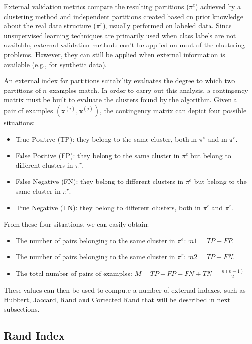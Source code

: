 External validation metrics compare the resulting partitions ($\pi^e$) achieved by a clustering method and independent partitions created based on prior knowledge about the real data structure ($\pi^r$), usually performed on labeled data. Since unsupervised learning techniques are primarily used when class labels are not available, external validation methods can't be applied on most of the clustering problems. However, they can still be applied when external information is available (e.g., for synthetic data)\cite{palacio2019evaluation}. 

An external index for partitions suitability evaluates the degree to which two partitions of $n$ examples match. In order to carry out this analysis, a contingency matrix must be built to evaluate the clusters found by the algorithm. Given a pair of examples $(\mathbf{x}^{(i)},\mathbf{x}^{(j)})$, the contingency matrix can depict four possible situations:
\begin{itemize}
    \item True Positive (TP): they belong to the same cluster, both in $\pi^e$ and in $\pi^r$.
    \item False Positive (FP): they belong to the same cluster in $\pi^e$ but belong to different clusters in $\pi^r$.
    \item False Negative (FN): they belong to different clusters in $\pi^e$ but belong to the same cluster in $\pi^r$.
    \item True Negative (TN): they belong to different clusters, both in $\pi^e$ and $\pi^r$.
\end{itemize}

From these four situations, we can easily obtain:

\begin{itemize}
\item The number of pairs belonging to the same cluster in $\pi^e$: $m1 = TP + FP.$
\item The number of pairs belonging to the same cluster in $\pi^r$: $m2 = TP + FN.$
\item The total number of pairs of examples: $M = TP + FP + FN + TN = \frac{n(n-1)}{2}$
\end{itemize}

These values can then be used to compute a number of external indexes, such as Hubbert, Jaccard, Rand and Corrected Rand \cite{jain1988algorithms} that will be described in next subsections.
 
\subsection{Rand Index}

